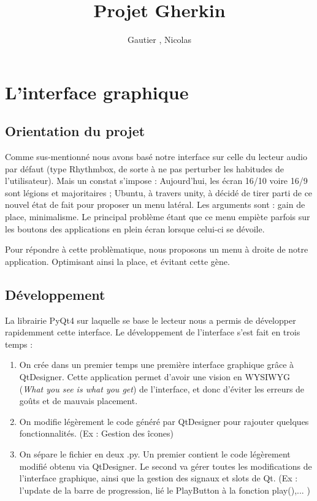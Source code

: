 \documentclass{report}
\author{Gautier \bsc{Dakin}, Nicolas \bsc{Ehrhardt}}
\title{Projet Gherkin}
\begin{document}
\maketitle



\section{L'interface graphique}
\subsection{Orientation du projet}
Comme sus-mentionné nous avons basé notre interface sur celle du lecteur audio par défaut (type Rhythmbox, de sorte à ne pas perturber les habitudes de l'utilisateur). Mais un constat s'impose : Aujourd'hui, les écran 16/10 voire 16/9 sont légions et majoritaires ; Ubuntu, à travers unity, à décidé de tirer parti de ce nouvel état de fait pour proposer un menu latéral. Les arguments sont : gain de place, minimalisme. Le principal problème étant que ce menu empiète parfois sur les boutons des applications en plein écran lorsque celui-ci se dévoile.

Pour répondre à cette problèmatique, nous proposons un menu à droite de notre application. Optimisant ainsi la place, et évitant cette gène.

\subsection{Développement}
La librairie PyQt4 sur laquelle se base le lecteur nous a permis de développer rapidemment cette interface. Le développement de l'interface s'est fait en trois temps :
\begin{enumerate}
\item On crée dans un premier temps une première interface graphique grâce à QtDesigner. Cette application permet d'avoir une vision en WYSIWYG (\emph{What you see is what you get}) de l'interface, et donc d'éviter les erreurs de goûts et de mauvais placement.
\item On modifie légèrement le code généré par QtDesigner pour rajouter quelques fonctionnalités. (Ex : Gestion des îcones)
\item On sépare le fichier en deux .py. Un premier contient le code légèrement modifié obtenu via QtDesigner. Le second va gérer toutes les modifications de l'interface graphique, ainsi que la gestion des signaux et slots de Qt. (Ex : l'update de la barre de progression, lié le PlayButton à la fonction play(),... )
\end{enumerate}
\end{document}
